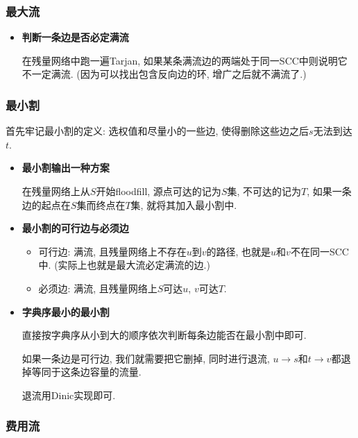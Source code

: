 \subsubsection{最大流}

\begin{itemize}

\item \textbf{判断一条边是否必定满流}

在残量网络中跑一遍Tarjan, 如果某条满流边的两端处于同一SCC中则说明它不一定满流. (因为可以找出包含反向边的环, 增广之后就不满流了.)

\end{itemize}

\subsubsection{最小割}

首先牢记最小割的定义: 选权值和尽量小的一些边, 使得删除这些边之后$s$无法到达$t$.

\begin{itemize}

\item \textbf{最小割输出一种方案}

在残量网络上从$S$开始floodfill, 源点可达的记为$S$集, 不可达的记为$T$, 如果一条边的起点在$S$集而终点在$T$集, 就将其加入最小割中.

\item \textbf{最小割的可行边与必须边}

\begin{itemize}
	\item 可行边: 满流, 且残量网络上不存在$u$到$v$的路径, 也就是$u$和$v$不在同一SCC中. (实际上也就是最大流必定满流的边.)

	\item 必须边: 满流, 且残量网络上$S$可达$u$, $v$可达$T$.
\end{itemize}

\item \textbf{字典序最小的最小割}

直接按字典序从小到大的顺序依次判断每条边能否在最小割中即可.

如果一条边是可行边, 我们就需要把它删掉, 同时进行退流, $u\to s$和$t\to v$都退掉等同于这条边容量的流量.

退流用Dinic实现即可.

\end{itemize}

\subsubsection{费用流}


